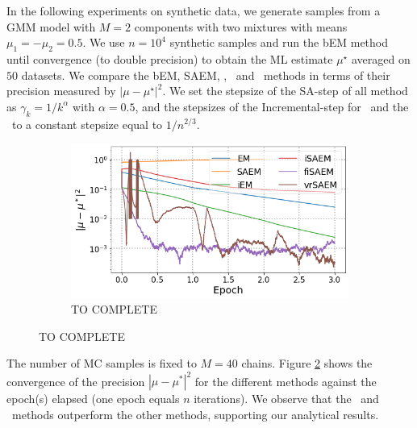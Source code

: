 \documentclass[11pt]{article}
\theoremstyle{t}
\begin{document}
In the following experiments on synthetic data, we generate samples from a GMM model with $M=2$ components with two mixtures with means $\mu_1 = - \mu_2 = 0.5$.
We use $n = 10^4$ synthetic samples and run the bEM method until convergence (to double precision) to obtain the ML estimate $\mu^\star$ averaged on $50$ datasets. We compare the bEM, SAEM, \ISAEM, \SAEMVR\ and \FISAEM\ methods in terms of their precision measured by $| \mu - \mu^\star |^2$. 
We set the stepsize of the \textsf{SA-step} of all method as $\gamma_k = 1/k^{\alpha}$ with $\alpha = 0.5$, and the stepsizes of the \textsf{Incremental-step} for \SAEMVR\ and the \FISAEM\ to a constant stepsize equal to $1/n^{2/3}$. 
\begin{figure}
\begin{minipage}{0.5\textwidth}\vspace{-.9cm}


\begin{figure}[H]
\includegraphics[width=\textwidth]{pic_paper/gmm_tts.png}\vspace{-.2cm}
\caption{TO COMPLETE}\vspace{-.2cm}
\label{fig:gmm_tts}
\end{figure}

\end{minipage}
\end{figure}

The number of MC samples is fixed to $M=40$ chains.
Figure \ref{fig:gmm_tts} shows the convergence of the precision $|\mu - \mu^*|^2$ for the different methods against the epoch(s) elapsed (one epoch equals $n$ iterations). We observe that the \SAEMVR\ and \FISAEM\ methods outperform the other methods, supporting our analytical results.



\vspace{.2cm}
\end{document}

